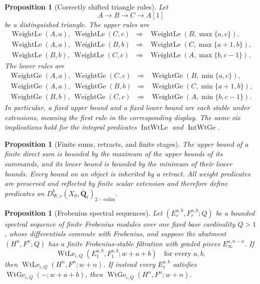 \documentclass[10pt]{article}
\newtheorem{proposition}[theorem]{Proposition}
\theoremstyle{definition}
\newcommand{\Qlb}{\overline{\mathbf Q}_\ell}
\newcommand{\WeilD}{D^b_{\mathrm W,c}}
\newcommand{\WtLe}{\operatorname{WeightLe}}
\newcommand{\WtGe}{\operatorname{WeightGe}}
\begin{document}
\begin{proposition}[Correctly shifted triangle rules]
Let
\[
                 A\longrightarrow B\longrightarrow C\longrightarrow A[1]
\]
be a distinguished triangle.  The upper rules are
\[
\begin{array}{lll}
 \WtLe(A,a),\ \WtLe(C,c)&\Longrightarrow&
       \WtLe(B,\max\{a,c\}),\\
 \WtLe(A,a),\ \WtLe(B,b)&\Longrightarrow&
       \WtLe(C,\max\{a+1,b\}),\\
 \WtLe(B,b),\ \WtLe(C,c)&\Longrightarrow&
       \WtLe(A,\max\{b,c-1\}).
\end{array}
\]
The lower rules are
\[
\begin{array}{lll}
 \WtGe(A,a),\ \WtGe(C,c)&\Longrightarrow&
       \WtGe(B,\min\{a,c\}),\\
 \WtGe(A,a),\ \WtGe(B,b)&\Longrightarrow&
       \WtGe(C,\min\{a+1,b\}),\\
 \WtGe(B,b),\ \WtGe(C,c)&\Longrightarrow&
       \WtGe(A,\min\{b,c-1\}).
\end{array}
\]
In particular, a fixed upper bound and a fixed lower bound are each stable
under extensions, meaning the first rule in the corresponding display.
The same six implications hold for the integral predicates
\(\operatorname{IntWtLe}\) and \(\operatorname{IntWtGe}\).
\end{proposition}

\begin{proposition}[Finite sums, retracts, and finite stages]
The upper bound of a finite direct sum is bounded by the maximum of the
upper bounds of its summands, and its lower bound is bounded by the minimum
of their lower bounds.  Every bound on an object is inherited by a retract.
All weight predicates are preserved and reflected by finite scalar
extension and therefore define predicates on
\(\WeilD(X_0,\Qlb)_{\mathrm{2-colim}}\).
\end{proposition}

\begin{proposition}[Frobenius spectral sequences]
Let \((E_r^{a,b},F_r^{a,b};Q)\) be a bounded spectral sequence of finite
Frobenius modules over one fixed base cardinality \(Q>1\), whose
differentials commute with Frobenius, and suppose the abutment
\((H^n,F^n;Q)\) has a finite Frobenius-stable filtration with graded pieces
\(E_\infty^{a,n-a}\).  If
\[
 \operatorname{WtLe}_{\iota,Q}
   (E_1^{a,b},F_1^{a,b};w+a+b)
 \quad\text{for every }a,b,
\]
then
\(\operatorname{WtLe}_{\iota,Q}(H^n,F^n;w+n)\).  If instead every
\(E_1^{a,b}\) satisfies
\(\operatorname{WtGe}_{\iota,Q}(-;w+a+b)\), then
\(\operatorname{WtGe}_{\iota,Q}(H^n,F^n;w+n)\).
\end{proposition}
\end{document}
